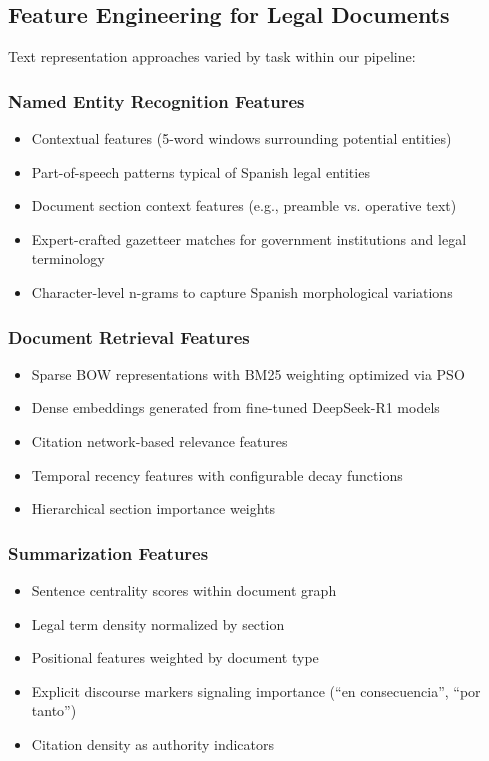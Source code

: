 \documentclass[conference]{IEEEtran}
\begin{document}
\subsection{Feature Engineering for Legal Documents}
Text representation approaches varied by task within our pipeline:

\subsubsection{Named Entity Recognition Features}
\begin{itemize}
    \item Contextual features (5-word windows surrounding potential entities)
    \item Part-of-speech patterns typical of Spanish legal entities
    \item Document section context features (e.g., preamble vs. operative text)
    \item Expert-crafted gazetteer matches for government institutions and legal terminology
    \item Character-level n-grams to capture Spanish morphological variations
\end{itemize}

\subsubsection{Document Retrieval Features}
\begin{itemize}
    \item Sparse BOW representations with BM25 weighting optimized via PSO
    \item Dense embeddings generated from fine-tuned DeepSeek-R1 models
    \item Citation network-based relevance features
    \item Temporal recency features with configurable decay functions
    \item Hierarchical section importance weights
\end{itemize}

\subsubsection{Summarization Features}
\begin{itemize}
    \item Sentence centrality scores within document graph
    \item Legal term density normalized by section
    \item Positional features weighted by document type
    \item Explicit discourse markers signaling importance (``en consecuencia'', ``por tanto'')
    \item Citation density as authority indicators
\end{itemize}
\end{document}
